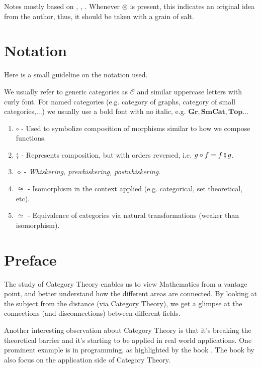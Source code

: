 Notes mostly based on \citet{maico2020categoria},
\citet{bradley2020topology}, \citet{borceux1994handbook}.
Whenever $\circledast$ is present, this indicates an original idea from the author,
thus, it should be taken with a grain of salt.


\section*{Notation}

Here is a small guideline on the notation used.

We usually refer to generic categories as $\mathcal C$ and similar uppercase letters with
curly font. For named categories (e.g. category of graphs, category of small categories,...)
we usually use a bold font with no italic, e.g. $\mathbf{Gr}, \mathbf{SmCat}, \mathbf{Top}$...

\begin{enumerate}
	\item $\circ$ - Used to symbolize composition of morphisms similar to how we compose functions.
	\item $\fatsemi$ - Represents composition, but with orders reversed, i.e. $g\circ f = f \fatsemi g$.
	\item $\diamond$ - \textit{Whiskering, prewhiskering, postwhiskering}.
	\item $\cong$ - Isomorphism in the context applied (e.g. categorical, set theoretical, etc).
	\item $\simeq$ - Equivalence of categories via natural transformations (weaker than isomorphism).
\end{enumerate}

\newpage
\section{Preface}

The study of Category Theory enables us to view Mathematics from a vantage
point, and better understand how the different areas are connected.
By looking at the subject from the distance (via Category Theory), we get
a glimpse at the connections (and disconnections) between different fields.

Another interesting observation about Category Theory is that it's
breaking the theoretical barrier and it's starting to be applied
in real world applications. One prominent example is in programming,
as highlighted by the book \citet{milewski2018category}.
The book by \citet{fong2019invitation} also focus on the application
side of Category Theory.

